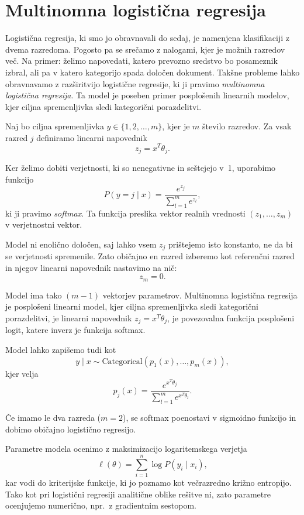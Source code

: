 \section{Multinomna logistična regresija}

Logistična regresija, ki smo jo obravnavali do sedaj, je namenjena klasifikaciji z dvema razredoma. Pogosto pa se srečamo z nalogami, kjer je možnih razredov več. Na primer: želimo napovedati, katero prevozno sredstvo bo posameznik izbral, ali pa v katero kategorijo spada določen dokument. Takšne probleme lahko obravnavamo z razširitvijo logistične regresije, ki ji pravimo \emph{multinomna logistična regresija}. Ta model je poseben primer posplošenih linearnih modelov, kjer ciljna spremenljivka sledi kategorični porazdelitvi.

Naj bo ciljna spremenljivka $y \in \{1,2,\dots,m\}$, kjer je $m$ število razredov. Za vsak razred $j$ definiramo linearni napovednik
\[
z_j = x^T \theta_j.
\]

Ker želimo dobiti verjetnosti, ki so nenegativne in seštejejo v~1, uporabimo funkcijo
\[
P(y = j \mid x) = \frac{e^{z_j}}{\sum_{l=1}^m e^{z_l}},
\]
ki ji pravimo \emph{softmax}. Ta funkcija preslika vektor realnih vrednosti $(z_1,\dots,z_m)$ v verjetnostni vektor.

Model ni enolično določen, saj lahko vsem $z_j$ prištejemo isto konstanto, ne da bi se verjetnosti spremenile. Zato običajno en razred izberemo kot referenčni razred in njegov linearni napovednik nastavimo na nič:
\[
z_m = 0.
\]

Model ima tako $(m-1)$ vektorjev parametrov. Multinomna logistična regresija je posplošeni linearni model, kjer ciljna spremenljivka sledi kategorični porazdelitvi, je linearni napovednik $z_j = x^T \theta_j$, je povezovalna funkcija posplošeni logit, katere inverz je funkcija softmax.

Model lahko zapišemo tudi kot
\[
y \mid x \sim \mathrm{Categorical}(p_1(x), \dots, p_m(x)),
\]
kjer velja
\[
p_j(x) = \frac{e^{x^T \theta_j}}{\sum_{l=1}^m e^{x^T \theta_l}}.
\]

Če imamo le dva razreda ($m=2$), se softmax poenostavi v sigmoidno funkcijo in dobimo običajno logistično regresijo. 

Parametre modela ocenimo z maksimizacijo logaritemskega verjetja
\[
\ell(\theta) = \sum_{i=1}^n \log P(y_i \mid x_i),
\]
kar vodi do kriterijske funkcije, ki jo poznamo kot večrazredno križno entropijo. Tako kot pri logistični regresiji analitične oblike rešitve ni, zato parametre ocenjujemo numerično, npr.\ z gradientnim sestopom.


